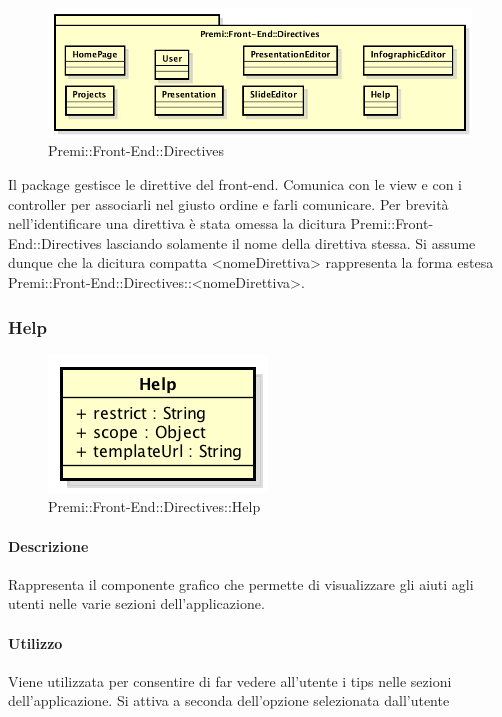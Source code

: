 \begin{figure}[h]
	\centering
	\includegraphics[width=0.7\linewidth]{img/premi_front_end_directives}
	\caption[Premi::Front-End::Directives]{Premi::Front-End::Directives}
\end{figure}
Il package gestisce le direttive del \gls{front-end}. Comunica con le view e con i controller per associarli nel giusto ordine e farli comunicare.
Per brevità nell'identificare una direttiva è stata omessa la dicitura Premi::\gls{Front-End}::Directives lasciando solamente il nome della direttiva stessa. Si assume dunque che la dicitura compatta <nomeDirettiva> rappresenta la forma estesa Premi::\gls{Front-End}::Directives::<nomeDirettiva>.
\newpage


\subsubsection{Help}
	\begin{figure}[h]
		\centering
		\includegraphics[width=0.5\linewidth]{img/premi_front_end_directives_help}
		\caption[Premi::Front-End::Directives::Help]{Premi::Front-End::Directives::Help}
	\end{figure}
	
	\paragraph{Descrizione}
	Rappresenta il componente grafico che permette di visualizzare gli aiuti agli utenti nelle varie sezioni dell'applicazione.
	
	\paragraph{Utilizzo}
	Viene utilizzata per consentire di far vedere all'utente i tips nelle sezioni dell'applicazione. Si attiva a seconda dell'opzione selezionata dall'utente
	
